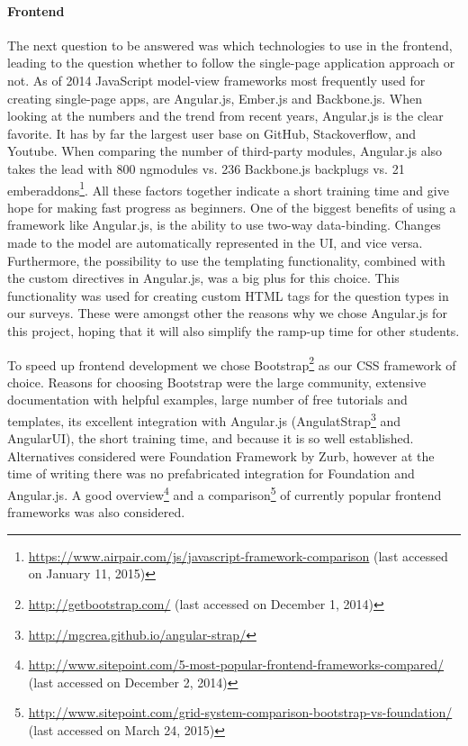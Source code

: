 	\paragraph{Frontend}

		The next question to be answered was which technologies to use in the frontend, leading to the question whether to follow the single-page application approach or not. As of 2014 JavaScript model-view frameworks most frequently used for creating single-page apps, are Angular.js, Ember.js and Backbone.js. When looking at the numbers and the trend from recent years, Angular.js is the clear favorite. It has by far the largest user base on GitHub, Stackoverflow, and Youtube. When comparing the number of third-party modules, Angular.js also takes the lead with 800 ngmodules vs. 236 Backbone.js backplugs vs. 21 emberaddons\footnote{\url{https://www.airpair.com/js/javascript-framework-comparison} (last accessed on January 11, 2015)}. All these factors together indicate a short training time and give hope for making fast progress as beginners. 
		One of the biggest benefits of using a framework like Angular.js, is the ability to use two-way data-binding. Changes made to the model are automatically represented in the UI, and vice versa. Furthermore, the possibility to use the templating functionality, combined with the custom directives in Angular.js, was a big plus for this choice. This functionality was used for creating custom HTML tags for the question types in our surveys. These were amongst other the reasons why we chose Angular.js for this project, hoping that it will also simplify the ramp-up time for other students.

		To speed up frontend development we chose Bootstrap\footnote{\url{http://getbootstrap.com/} (last accessed on December 1, 2014)} as our CSS framework of choice. Reasons for choosing Bootstrap were the large community, extensive documentation with helpful examples, large number of free tutorials and templates, its excellent integration with Angular.js (AngulatStrap\footnote{\url{http://mgcrea.github.io/angular-strap/}} and AngularUI), the short training time, and because it is so well established.
		Alternatives considered were Foundation Framework by Zurb, however at the time of writing there was no prefabricated integration for Foundation and Angular.js.
		A good overview\footnote{\url{http://www.sitepoint.com/5-most-popular-frontend-frameworks-compared/} (last accessed on December 2, 2014)} and a comparison\footnote{\url{http://www.sitepoint.com/grid-system-comparison-bootstrap-vs-foundation/} (last accessed on March 24, 2015)} of currently popular frontend frameworks was also considered.
	

